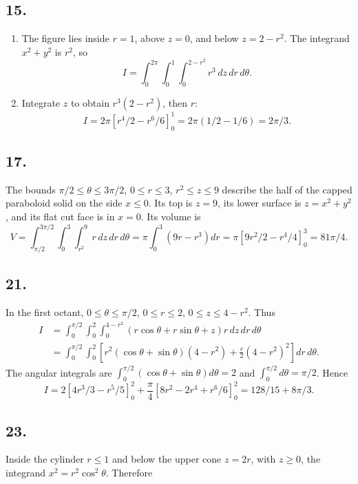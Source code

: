 \documentclass[11pt]{article}
\newcommand{\ex}[1]{\subsection*{#1.}}
\newcommand{\ans}[1]{\boxed{#1}}
\begin{document}
\begin{center}\end{center}
\ex{15}
\begin{enumerate}[label=(\alph*)]
\item The figure lies inside $r=1$, above $z=0$, and below $z=2-r^2$. The integrand $x^2+y^2$ is $r^2$, so
\[\ans{I=\int_0^{2\pi}\int_0^1\int_0^{2-r^2}r^3\,dz\,dr\,d\theta}.\]
\item Integrate $z$ to obtain $r^3(2-r^2)$, then $r$:
\[I=2\pi[r^4/2-r^6/6]_0^1=2\pi(1/2-1/6)=\ans{2\pi/3}.\]
\end{enumerate}
\ex{17}
The bounds $\pi/2\le\theta\le3\pi/2$, $0\le r\le3$, $r^2\le z\le9$ describe the half of the capped paraboloid solid on the side $x\le0$. Its top is $z=9$, its lower surface is $z=x^2+y^2$, and its flat cut face is in $x=0$. Its volume is
\[V=\int_{\pi/2}^{3\pi/2}\int_0^3\int_{r^2}^9r\,dz\,dr\,d\theta
=\pi\int_0^3(9r-r^3)dr
=\pi[9r^2/2-r^4/4]_0^3=\ans{81\pi/4}.\]
\begin{center}\end{center}
\ex{21}
In the first octant, $0\le\theta\le\pi/2$, $0\le r\le2$, $0\le z\le4-r^2$. Thus
\begin{align*}
I&=\int_0^{\pi/2}\int_0^2\int_0^{4-r^2}(r\cos\theta+r\sin\theta+z)r\,dz\,dr\,d\theta\\
&=\int_0^{\pi/2}\int_0^2\left[r^2(\cos\theta+\sin\theta)(4-r^2)+\frac r2(4-r^2)^2\right]dr\,d\theta.
\end{align*}
The angular integrals are $\int_0^{\pi/2}(\cos\theta+\sin\theta)d\theta=2$ and $\int_0^{\pi/2}d\theta=\pi/2$. Hence
\[I=2[4r^3/3-r^5/5]_0^2+\frac\pi4[8r^2-2r^4+r^6/6]_0^2
=\ans{128/15+8\pi/3}.\]
\ex{23}
Inside the cylinder $r\le1$ and below the upper cone $z=2r$, with $z\ge0$, the integrand $x^2=r^2\cos^2\theta$. Therefore
\end{document}
